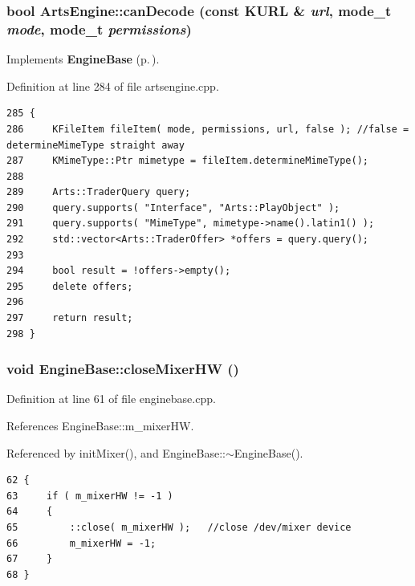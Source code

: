 \subsubsection{\setlength{\rightskip}{0pt plus 5cm}bool Arts\-Engine::can\-Decode (const KURL \& {\em url}, mode\_\-t {\em mode}, mode\_\-t {\em permissions})\hspace{0.3cm}{\tt  [virtual]}}\label{classArtsEngine_ArtsEnginea4}




Implements {\bf Engine\-Base} {\rm (p.\,\pageref{classEngineBase_EngineBasea4})}.

Definition at line 284 of file artsengine.cpp.



\footnotesize\begin{verbatim}285 {
286     KFileItem fileItem( mode, permissions, url, false ); //false = determineMimeType straight away
287     KMimeType::Ptr mimetype = fileItem.determineMimeType();
288 
289     Arts::TraderQuery query;
290     query.supports( "Interface", "Arts::PlayObject" );
291     query.supports( "MimeType", mimetype->name().latin1() );
292     std::vector<Arts::TraderOffer> *offers = query.query();
293 
294     bool result = !offers->empty();
295     delete offers;
296 
297     return result;
298 }
\end{verbatim}\normalsize 
{}
\subsubsection{\setlength{\rightskip}{0pt plus 5cm}void Engine\-Base::close\-Mixer\-HW ()\hspace{0.3cm}{\tt  [protected, inherited]}}\label{classEngineBase_EngineBaseb0}




Definition at line 61 of file enginebase.cpp.

References Engine\-Base::m\_\-mixer\-HW.

Referenced by init\-Mixer(), and Engine\-Base::$\sim$Engine\-Base().



\footnotesize\begin{verbatim}62 {
63     if ( m_mixerHW != -1 )
64     {
65         ::close( m_mixerHW );   //close /dev/mixer device
66         m_mixerHW = -1;
67     }
68 }
\end{verbatim}\normalsize 
{}
